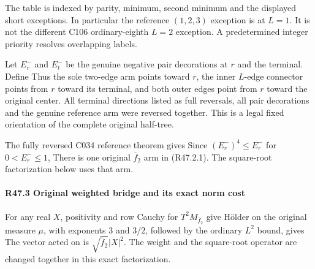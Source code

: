The table is indexed by parity, minimum, second minimum and the
displayed short exceptions. In particular the reference \((1,2,3)\)
exception is at \(L=1.\) It is not the different C106 ordinary-eighth \(L=2\)
exception. A predetermined integer priority resolves overlapping labels.

Let \(E_r^-\) and \(E_t^-\) be the genuine negative pair decorations at \(r\) and
the terminal. Define
Thus the sole two-edge arm points toward \(r\), the inner \(L\)-edge connector
points from \(r\) toward its terminal, and both outer edges point from \(r\)
toward the original center. All terminal directions listed as full reversals,
all pair decorations and the genuine reference arm were reversed together.
This is a legal fixed orientation of the complete original half-tree.

The fully reversed C034 reference theorem gives
Since \((E_r^-)^4\le E_r^-\) for \(0<E_r^-\le1\),
There is one original \(\bar f_2\) arm in (R47.2.1). The square-root
factorization below uses that arm.

\paragraph{R47.3 Original weighted bridge and its exact norm cost}

For any real \(X\), positivity and row Cauchy for \(T^2M_{\bar f_2}\) give
H\"older on the original measure \(\mu\), with exponents \(3\) and \(3/2\),
followed by the ordinary \(L^2\) bound, gives
The vector acted on is \(\sqrt{\bar f_2}|X|^2.\) The weight and the square-root
operator are changed together in this exact factorization.

